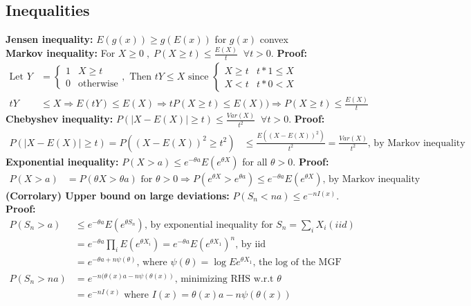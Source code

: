 \documentclass{article}
\newcommand{\abs}[1]{\lvert#1\rvert}
\begin{document}
\subsection{Inequalities}
\textbf{Jensen inequality: } $E(g(x)) \geq g(E(x))$ for $g(x)$ convex\\
\textbf{Markov inequality: } For $X\geq 0 \;, \;P(X \geq t) \leq \frac{E(X)}{t} \; \; \forall t>0$. \textbf{Proof: }\\
\begin{align*}
    \textrm{Let } Y &= \begin{cases}
        1 & X \geq t\\
        0 & \textrm{otherwise}
    \end{cases}, \textrm{  Then } tY \leq X \textrm{ since } \begin{cases}
        X \geq t & t*1 \leq X \\
        X < t & t*0 < X
    \end{cases}\\
    tY &\leq X \Longrightarrow E(tY) \leq E(X) \Longrightarrow tP(X \geq t) \leq E(X)) \Longrightarrow P(X \geq t) \leq \frac{E(X)}{t}
\end{align*}
\textbf{Chebyshev inequality: } $P(\abs{X - E(X)} \geq t) \leq \frac{Var(X)}{t^2} \; \; \forall t > 0$. \textbf{Proof: }\\
\begin{align*}
    P(\abs{X - E(X)} \geq t) = P((X - E(X))^2 \geq t^2) &\leq \frac{E((X - E(X))^2)}{t^2} = \frac{Var(X)}{t^2} \textrm{, by Markov inequality}
\end{align*}
\textbf{Exponential inequality: } $P(X > a) \leq e^{-\theta a} E(e^{\theta X})$ for all $\theta > 0$. \textbf{Proof:}\\
\begin{align*}
    P(X > a) &= P(\theta X > \theta a) \textrm{ for } \theta > 0 \Longrightarrow P(e^{\theta X} > e^{\theta a}) \leq e^{-\theta a} E(e^{\theta X}) \textrm{, by Markov inequality}
\end{align*}
\textbf{(Corrolary) Upper bound on large deviations: } $P(S_n < na) \leq e^{-nI(x)}$. \textbf{Proof: }\\
\begin{align*}
    P(S_n > a) &\leq e^{-\theta a} E(e^{\theta S_n}) \textrm{, by exponential inequality for } S_n = \sum_i X_i (iid)\\
    &= e^{-\theta a} \prod_i E(e^{\theta X_i}) = e^{-\theta a} E(e^{\theta X_1})^n \textrm{, by iid}\\
    &= e^{-\theta a + n \psi(\theta)} \textrm{, where } \psi(\theta) = \log{Ee^{\theta X_1}} \textrm{, the log of the MGF}\\
    P(S_n > na) &= e^{-n(\theta(x) a - n \psi(\theta(x))} \textrm{, minimizing RHS w.r.t } \theta\\
    &= e^{-nI(x)} \textrm{ where } I(x) = \theta(x) a - n \psi(\theta(x))
\end{align*}
\end{document}

